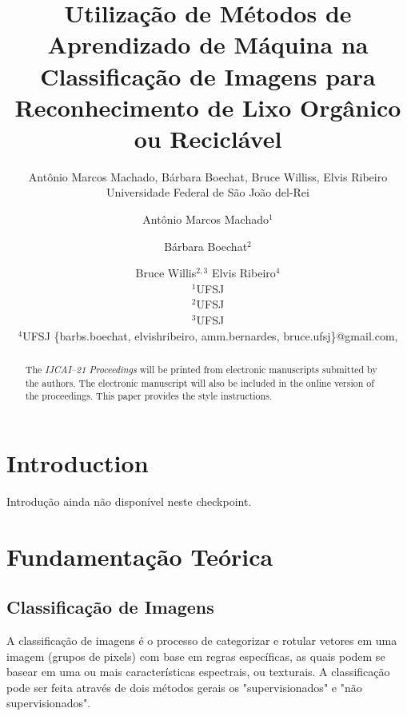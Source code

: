 \documentclass{article}
\title{Utilização de Métodos de Aprendizado de Máquina na Classificação de Imagens para
Reconhecimento de Lixo Orgânico ou Reciclável}
\author{
    Antônio Marcos Machado, Bárbara Boechat, Bruce Williss, Elvis Ribeiro
    \affiliations
    Universidade Federal de São João del-Rei
    \emails
}
\author{
Antônio Marcos Machado$^1$
\and
Bárbara Boechat$^2$\and
Bruce Willis$^{2,3}$\And
Elvis Ribeiro$^4$

\affiliations
$^1$UFSJ\\
$^2$UFSJ\\
$^3$UFSJ\\
$^4$UFSJ
\emails
\{barbs.boechat, elvishribeiro, amm.bernardes, bruce.ufsj\}@gmail.com,
}
\begin{document}
\maketitle



\begin{abstract}
  The {\it IJCAI--21 Proceedings} will be printed from electronic
  manuscripts submitted by the authors. The electronic manuscript will
  also be included in the online version of the proceedings. This paper
  provides the style instructions.
\end{abstract}

\section{Introduction}

Introdução ainda não disponível neste checkpoint.

\section{Fundamentação Teórica}

\subsection{Classificação de Imagens}
A classificação de imagens é o processo de categorizar e rotular vetores em uma imagem (grupos de pixels) com base em regras específicas, as quais podem se basear em uma ou mais características espectrais, ou texturais. A classificação pode ser feita através de dois métodos gerais os "supervisionados" e "não supervisionados". %
\end{document}
